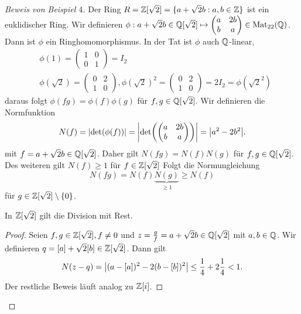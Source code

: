 \begin{proof}[Beweis von Beispiel $4$]
	Der Ring $R = \mathbb{Z} [\sqrt{2}] = \{a + \sqrt{2} b: a,b \in \mathbb{Z}\}$ ist ein euklidischer Ring.
	Wir definieren $\phi: a + \sqrt{2} b \in \mathbb{Q}[\sqrt{2}] \mapsto \begin{pmatrix} 
		a & 2b\\ b & a
	\end{pmatrix} \in \operatorname{Mat}_{22}(\mathbb{Q})$.
	Dann ist $\phi$ ein Ringhomomorphismus.
	In der Tat ist $\phi$ auch $\mathbb{Q}$-linear, 
	\begin{align*}
		&\phi(1) = \begin{pmatrix} 
			1 &0\\ 0 &1
		\end{pmatrix} = I_2\\
		&\phi(\sqrt{2}) = \begin{pmatrix} 
			0 &2\\ 1 &0
		\end{pmatrix}, \phi(\sqrt{2})^2 = \begin{pmatrix} 
			0 &2\\ 1 &0
		\end{pmatrix}  = 2I_2 = \phi(\sqrt{2}^2)
	\end{align*} 
	daraus folgt $\phi(fg) = \phi(f) \phi(g)$ für $f,g \in \mathbb{Q}[\sqrt{2}]$.
	Wir definieren die Normfunktion
	\begin{align*}
		N(f) = \abs{\det(\phi(f))} = \abs{\det(\begin{pmatrix} 
				a & 2b\\ b &a
		\end{pmatrix} )} = \abs{a^2 - 2b^2}
	.\end{align*}
	mit $f = a + \sqrt{2} b \in \mathbb{Q}[\sqrt{2}]$.
	Daher gilt $N(fg) = N(f)N(g)$ für $f,g \in \mathbb{Q}[\sqrt{2}]$.
	Des weiteren gilt $N(f) \geq 1$ für $f \in \mathbb{Z}[\sqrt{2}]$ 
	Folgt die Normungleichung 
	\[
		N(fg) = N(f) \underbrace{N(g)}_{\geq 1} \geq N(f)
	\]
	für $g \in \mathbb{Z}[\sqrt{2}] \setminus \{0\} $.
	\begin{lemma}
		In $\mathbb{Z}[\sqrt{2}]$ gilt die Division mit Rest.
	\end{lemma}
	\begin{proof}
		Seien $f,g \in \mathbb{Z}[\sqrt{2}], f \neq 0$ und $z= \frac{g}{f} = a + \sqrt{2} b \in \mathbb{Q}[\sqrt{2}]$ mit $a,b \in \mathbb{Q}$.
		Wir definieren $q = [a] + \sqrt{2} [b] \in \mathbb{Z}[\sqrt{2}]$. Dann gilt
		\begin{align*}
			N(z-q) = \abs{(a-[a])^2 - 2 (b-[b])^2} \leq \frac{1}{4} + 2 \frac{1}{4} < 1
		.\end{align*}
		Der restliche Beweis läuft analog zu $\mathbb{Z}[i]$.
	\end{proof}
\end{proof}

